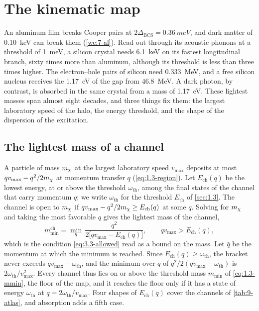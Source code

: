 \section{The kinematic map}\label{sec:9.2}

An aluminum film breaks Cooper pairs at $2\Delta_{\mathrm{BCS}} = \SI{0.36}{meV}$, and dark matter of \SI{0.10}{keV} can break them (\cref{we:7-al}). Read out through its acoustic phonons at a threshold of \SI{1}{meV}, a silicon crystal needs \SI{6.1}{keV} on its fastest longitudinal branch, sixty times more than aluminum, although its threshold is less than three times higher. The electron--hole pairs of silicon need \SI{0.333}{MeV}, and a free silicon nucleus receives the \SI{1.17}{eV} of the gap from \SI{46.8}{MeV}. A dark photon, by contrast, is absorbed in the same crystal from a mass of \SI{1.17}{eV}. These lightest masses span almost eight decades, and three things fix them: the largest laboratory speed of the halo, the energy threshold, and the shape of the dispersion of the excitation.

\subsection{The lightest mass of a channel}\label{sec:9.2-mmin}

A particle of mass $m_{\chi}$ at the largest laboratory speed $v_{\mathrm{max}}$ deposits at most $qv_{\mathrm{max}} - q^2/2m_{\chi}$ at momentum transfer $q$ (\cref{eq:1.3-region}). Let $E_{\mathrm{ch}}(q)$ be the lowest energy, at or above the threshold $\omega_{\mathrm{th}}$, among the final states of the channel that carry momentum $q$; we write $\omega_{\mathrm{th}}$ for the threshold $E_{\mathrm{th}}$ of \cref{sec:1.3}. The channel is open to $m_{\chi}$ if $qv_{\mathrm{max}} - q^2/2m_{\chi} \ge E_{\mathrm{ch}}(q)$ at some $q$. Solving for $m_{\chi}$ and taking the most favorable $q$ gives the lightest mass of the channel,
\begin{equation}
  m_{\mathrm{min}}^{\mathrm{ch}} = \min_{q}\,\frac{q^2}{2\bigl[qv_{\mathrm{max}} - E_{\mathrm{ch}}(q)\bigr]} , \qquad qv_{\mathrm{max}} > E_{\mathrm{ch}}(q) ,
  \label{eq:9.2-mch}
\end{equation}
which is the condition \cref{eq:3.3-allowed} read as a bound on the mass. Let $\bar q$ be the momentum at which the minimum is reached. Since $E_{\mathrm{ch}}(q) \ge \omega_{\mathrm{th}}$, the bracket never exceeds $qv_{\mathrm{max}} - \omega_{\mathrm{th}}$, and the minimum over $q$ of $q^2/2(qv_{\mathrm{max}} - \omega_{\mathrm{th}})$ is $2\omega_{\mathrm{th}}/v_{\mathrm{max}}^2$. Every channel thus lies on or above the threshold mass $m_{\mathrm{min}}$ of \cref{eq:1.3-mmin}, the floor of the map, and it reaches the floor only if it has a state of energy $\omega_{\mathrm{th}}$ at $q = 2\omega_{\mathrm{th}}/v_{\mathrm{max}}$. Four shapes of $E_{\mathrm{ch}}(q)$ cover the channels of \cref{tab:9-atlas}, and absorption adds a fifth case.

